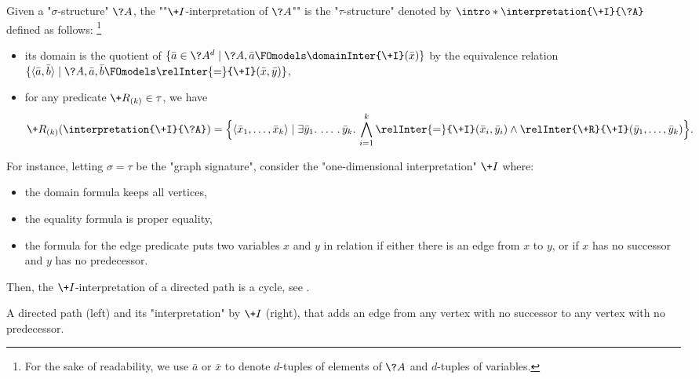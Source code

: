 Given a "$\sigma$-structure" $\?A$, the \AP""$\+I$-interpretation of $\?A$"" is the "$\tau$-structure" denoted by \AP$\intro*\interpretation{\+I}{\?A}$ defined as follows:%
\footnote{For the sake of readability, we use $\bar a$ or $\bar x$ to
denote $d$-tuples of elements of $\?A$ and $d$-tuples of variables.}
\begin{itemize}
	\item its domain is the quotient of 
		$\{\bar a \in \?A^d \mid \?A, \bar a \FOmodels \domainInter{\+I}(\bar x)\}$
		by the equivalence relation
		$\set{\tup{\bar a, \bar b} \mid \?A, \bar a, \bar b \FOmodels \relInter{=}{\+I}(\bar x, \bar y)}$,
	\item for any predicate $\+R_{(k)} \in \tau$,
		we have
		\[
			\+R_{(k)}(\interpretation{\+I}{\?A}) =
			\Big\{\tup{\bar x_1, \dotsc, \bar x_k} \mid
				\exists \bar y_1.\, \dotsc.\, \bar y_k.\,
				\bigwedge_{i=1}^k \relInter{=}{\+I}(\bar x_i, \bar y_i)
				\land \relInter{\+R}{\+I}(\bar y_1, \dotsc, \bar y_k)
			\Big\}.
		\]
\end{itemize}
For instance, letting $\sigma =\tau$ be the "graph signature", consider
the "one-dimensional interpretation" $\+I$ where:
\begin{itemize}
	\item the domain formula keeps all vertices,
	\item the equality formula is proper equality,
	\item the formula for the edge predicate puts two variables $x$ and $y$ in relation
		if either there is an edge from $x$ to $y$, or if $x$ has no successor and $y$ has no predecessor.
\end{itemize}
Then, the $\+I$-interpretation of a directed path is a cycle,
see .
\begin{marginfigure}
	\centering
	\qquad
	\caption{
		\AP\label{fig:interpretation-path-into-cycle}
		A directed path (left) and its "interpretation" by $\+I$ (right),
		that adds an edge from any vertex with no successor to any vertex with no predecessor.
	}
\end{marginfigure}

